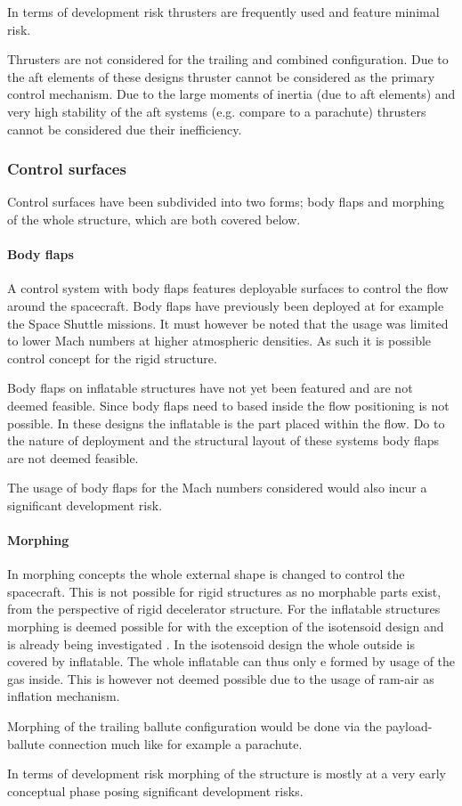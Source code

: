In terms of development risk thrusters are frequently used and feature minimal risk.

Thrusters are not considered for the trailing and combined configuration. Due to the aft elements of these designs thruster cannot be considered as the primary control mechanism. Due to the large moments of inertia (due to aft elements) and very high stability of the aft systems (e.g. compare to a parachute) thrusters cannot be considered due their inefficiency. 

\subsubsection{Control surfaces}
Control surfaces have been subdivided into two forms; body flaps and morphing of the whole structure, which are both covered below.

\paragraph{Body flaps}
A control system with body flaps features deployable surfaces to control the flow around the spacecraft. Body flaps have previously been deployed at for example the Space Shuttle missions. It must however be noted that the usage was limited to lower Mach numbers at higher atmospheric densities. As such it is possible control concept for the rigid structure.

Body flaps on inflatable structures have not yet been featured and are not deemed feasible. Since body flaps need to based inside the flow positioning is not possible. In these designs the inflatable is the part placed within the flow. Do to the nature of deployment and the structural layout of these systems body flaps are not deemed feasible.

The usage of body flaps for the Mach numbers considered would also incur a significant development risk.

\paragraph{Morphing}
In morphing concepts the whole external shape is changed to control the spacecraft. This is not possible for rigid structures as no morphable parts exist, from the perspective of rigid decelerator structure. 
 For the inflatable structures morphing is deemed possible for with the exception of the isotensoid design and is already being investigated \cite{Hughes2011}. In the isotensoid design the whole outside is covered by inflatable. The whole inflatable can thus only e formed by usage of the gas inside. This is however not deemed possible due to the usage of ram-air as inflation mechanism.

Morphing of the trailing ballute configuration would be done via the payload-ballute connection much like for example a parachute.

In terms of development risk morphing of the structure is mostly at a very early conceptual phase posing significant development risks.